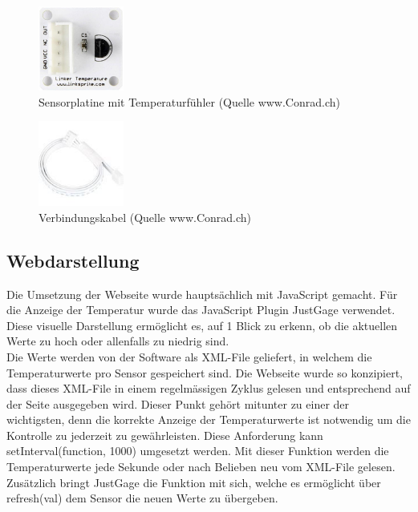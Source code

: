 \begin{figure}[H]%
\centering
\includegraphics[width=0.25\textwidth]{Images/Sensorplatine.jpg}
\caption{Sensorplatine mit Temperaturfühler (Quelle www.Conrad.ch)}
\label{fig:sensor}
\end{figure}

\begin{figure}[H]%
\centering
\includegraphics[width=0.25\textwidth]{Images/Verbindungskabel.jpg}
\caption{Verbindungskabel (Quelle www.Conrad.ch)}
\label{fig:cable}
\end{figure}

\subsection{Webdarstellung}
Die Umsetzung der Webseite wurde hauptsächlich mit JavaScript gemacht.
Für die Anzeige der Temperatur wurde das JavaScript Plugin JustGage verwendet. Diese visuelle Darstellung ermöglicht es, auf 1 Blick zu erkenn, ob die aktuellen Werte zu hoch oder allenfalls zu niedrig sind.\\

Die Werte werden von der Software als XML-File geliefert, in welchem die Temperaturwerte pro Sensor gespeichert sind. Die Webseite wurde so konzipiert, dass dieses XML-File in einem regelmässigen Zyklus gelesen und entsprechend auf der Seite ausgegeben wird. Dieser Punkt gehört mitunter zu einer der wichtigsten, denn die korrekte Anzeige der Temperaturwerte ist notwendig um die Kontrolle zu jederzeit zu gewährleisten. Diese Anforderung kann setInterval(function, 1000) umgesetzt werden. Mit dieser Funktion werden die Temperaturwerte jede Sekunde oder nach Belieben neu vom XML-File gelesen.
Zusätzlich bringt JustGage die Funktion mit sich, welche es ermöglicht über refresh(val) dem Sensor die neuen Werte zu übergeben.\\


